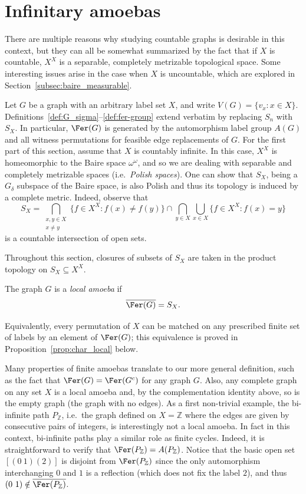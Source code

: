 
\section{Infinitary amoebas}\label{sec:infinitary_amoeba_graphs}

There are multiple reasons why studying countable graphs is desirable in this context, but they can all be somewhat summarized by the fact that if $X$ is countable, $X^X$ is a separable, completely metrizable topological space.
Some interesting issues arise in the case when $X$ is uncountable, which are explored in Section~\ref{subsec:baire_measurable}.

Let $G$ be a graph with an arbitrary label set $X$, and write $V(G)=\{v_x:x\in X\}$.
Definitions~\ref{def:G_sigma}--\ref{def:fer-group} extend verbatim by replacing $S_n$ with $S_X$.
In particular, $\Fer(G)$ is generated by the automorphism label group $A(G)$ and all witness permutations for feasible edge replacements of $G$.
For the first part of this section, assume that $X$ is countably infinite.
In this case, $X^X$ is homeomorphic to the Baire space $\omega^\omega$, and so we are dealing with separable and completely metrizable spaces (i.e.\ \emph{Polish spaces}).
One can show that $S_X$, being a $G_\delta$ subspace of the Baire space, is also Polish and thus its topology is induced by a complete metric.
Indeed, observe that $$S_X=\bigcap_{\substack{x,y\in X \\ x\neq y}}\{f\in X^X:f(x)\neq f(y)\}\cap\bigcap_{y\in X}\bigcup_{x\in X}\{f\in X^X:f(x)=y\}$$ is a countable intersection of open sets.

Throughout this section, closures of subsets of $S_X$ are taken in the product topology on $S_X\subseteq X^X$.

\begin{definition}\label{def:infinite-local-amoeba}
    The graph $G$ is a \emph{local amoeba} if
    \[
        \overline{\Fer(G)}=S_X.
    \]
\end{definition}

Equivalently, every permutation of $X$ can be matched on any prescribed finite set of labels by an element of $\Fer(G)$; this equivalence is proved in Proposition~\ref{prop:char_local} below.

Many properties of finite amoebas translate to our more general definition, such as the fact that $\Fer(G)=\Fer(G^c)$ for any graph $G$.
Also, any complete graph on any set $X$ is a local amoeba and, by the complementation identity above, so is the empty graph (the graph with no edges).
As a first non-trivial example, the bi-infinite path $P_\mathbb Z$, i.e.\ the graph defined on $X=\mathbb Z$ where the edges are given by consecutive pairs of integers, is interestingly not a local amoeba.
In fact in this context, bi-infinite paths play a similar role as finite cycles.
Indeed, it is straightforward to verify that $\Fer(P_\mathbb Z)=A(P_\mathbb Z)$.
Notice that the basic open set $[(0\ 1)(2)]$ is disjoint from $\Fer(P_\mathbb Z)$ since the only automorphism interchanging $0$ and $1$ is a reflection (which does not fix the label $2$), and thus $(0\ 1)\notin\overline{\Fer(P_\mathbb Z)}$.

